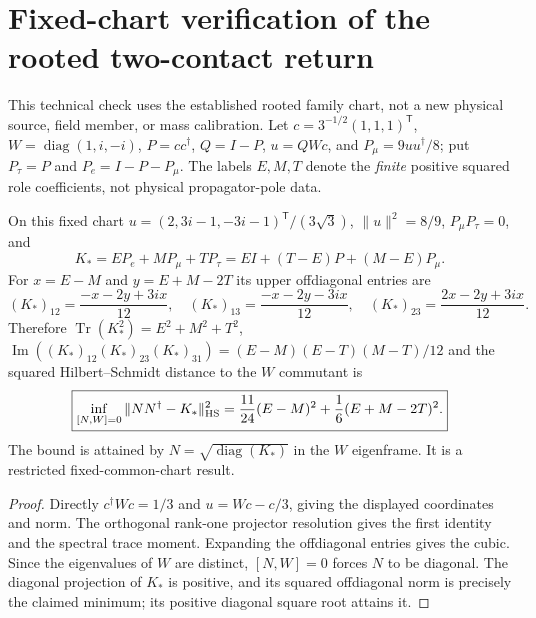 \documentclass[11pt,a4paper]{article}
\begin{document}
\section{Fixed-chart verification of the rooted two-contact return}
\label{p5d:sec:v158-two-contact-return-checks}
This technical check uses the established rooted family chart, not a
new physical source, field member, or mass calibration.  Let
$c=3^{-1/2}(1,1,1)^\mathsf T$,
$W=\operatorname{diag}(1,i,-i)$,
$P=cc^\dagger$, $Q=I-P$, $u=QWc$, and
$P_\mu=9uu^\dagger/8$; put $P_\tau=P$ and
$P_e=I-P-P_\mu$.  The labels $E,M,T$ denote the \emph{finite}
positive squared role coefficients, not physical propagator-pole data.

\begin{proposition}
\label{p5d:prop:v158-two-contact-matrix-replay}
On this fixed chart $u=(2,3i-1,-3i-1)^\mathsf T/(3\sqrt3)$,
$\|u\|^2=8/9$, $P_\mu P_\tau=0$, and
\[
K_*=EP_e+MP_\mu+TP_\tau
=E I+(T-E)P+(M-E)P_\mu.
\]
For $x=E-M$ and $y=E+M-2T$ its upper offdiagonal entries are
\[
(K_*)_{12}=\frac{-x-2y+3ix}{12},\quad
(K_*)_{13}=\frac{-x-2y-3ix}{12},\quad
(K_*)_{23}=\frac{2x-2y+3ix}{12}.
\]
Therefore $\operatorname{Tr}(K_*^2)=E^2+M^2+T^2$,
$\operatorname{Im}((K_*)_{12}(K_*)_{23}(K_*)_{31})
=(E-M)(E-T)(M-T)/12$ and the squared Hilbert--Schmidt
distance to the $W$ commutant is
\[
 \boxed{\inf_{[N,W]=0}\|NN^\dagger-K_*\|_{\rm HS}^2
 =\frac{11}{24}(E-M)^2+\frac16(E+M-2T)^2.}
\]
The bound is attained by $N=\sqrt{\operatorname{diag}(K_*)}$
in the $W$ eigenframe.  It is a restricted fixed-common-chart result.
\end{proposition}
\begin{proof}
Directly $c^\dagger Wc=1/3$ and
$u=Wc-c/3$, giving the displayed coordinates and norm.
The orthogonal rank-one projector resolution gives the first identity
and the spectral trace moment.  Expanding the offdiagonal entries
gives the cubic.  Since the eigenvalues of $W$ are distinct,
$[N,W]=0$ forces $N$ to be diagonal.  The diagonal projection of
$K_*$ is positive, and its squared offdiagonal norm is precisely the
claimed minimum; its positive diagonal square root attains it.
\end{proof}
\end{document}
